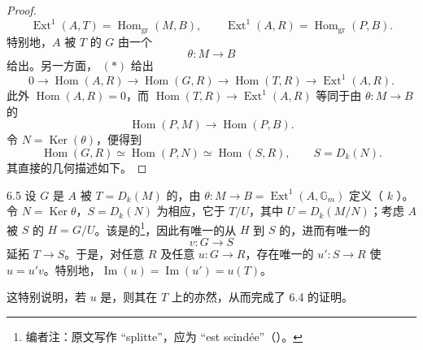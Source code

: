 \begin{proof}
\[\operatorname{Ext}^1(A,T)=\operatorname{Hom}_{\mathrm{gr}}(M,B),\qquad
\operatorname{Ext}^1(A,R)=\operatorname{Hom}_{\mathrm{gr}}(P,B).\tag{xx}
\]
特别地，$A$ 被 $T$ 的 $G$ 由一个
\[
\theta:M\longrightarrow B
\]
给出。另一方面， $(*)$ 给出
\[
0\longrightarrow\operatorname{Hom}(A,R)\longrightarrow\operatorname{Hom}(G,R)
\longrightarrow\operatorname{Hom}(T,R)\longrightarrow\operatorname{Ext}^1(A,R).
\]
此外 $\operatorname{Hom}(A,R)=0$，而 $\operatorname{Hom}(T,R)\to\operatorname{Ext}^1(A,R)$ 等同于由 $\theta:M\to B$ 的
\[
\operatorname{Hom}(P,M)\longrightarrow\operatorname{Hom}(P,B).
\]
令 $N=\operatorname{Ker}(\theta)$，便得到
\[
\operatorname{Hom}(G,R)\simeq\operatorname{Hom}(P,N)\simeq\operatorname{Hom}(S,R),
\qquad S=D_k(N).
\]
其直接的几何描述如下。
\end{proof}
\begin{SGAresult}{}{6.5}
设 $G$ 是 $A$ 被 $T=D_k(M)$ 的，由 $\theta:M\to B=\operatorname{Ext}^1(A,\mathbb G_m)$ 定义（ $k$ ）。令 $N=\operatorname{Ker}\theta$，$S=D_k(N)$ 为相应，它于 $T/U$，其中 $U=D_k(M/N)$；考虑 $A$ 被 $S$ 的 $H=G/U$。该是的\footnote{编者注：原文写作 ``splitte''，应为 ``est scindée''（）。}，因此有唯一的从 $H$ 到 $S$ 的，进而有唯一的
\[
v:G\longrightarrow S
\]
延拓 $T\to S$。于是，对任意 $R$ 及任意 $u:G\to R$，存在唯一的 $u':S\to R$ 使 $u=u'v$。特别地，$\operatorname{Im}(u)=\operatorname{Im}(u')=u(T)$。
\end{SGAresult}
这特别说明，若 $u$ 是，则其在 $T$ 上的亦然，从而完成了 6.4 的证明。
